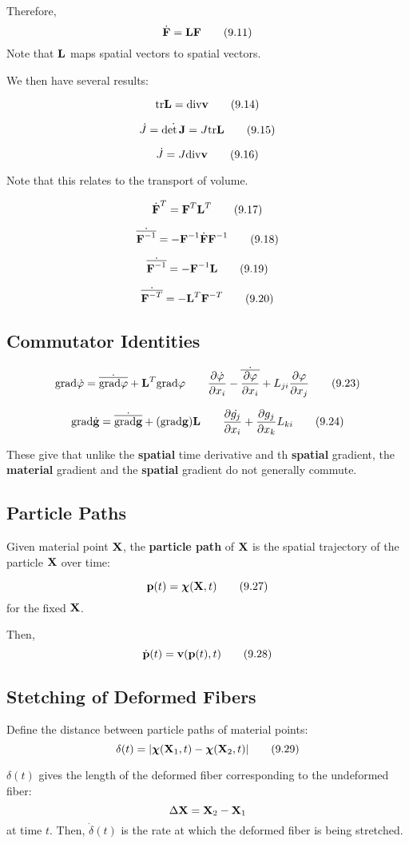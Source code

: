\documentclass{article}
\newcommand{\Chi}{\boldsymbol{\chi}}
\begin{document}
Therefore,
\[
	\dot{\textbf{F}} = \textbf{L}\textbf{F}\tag{9.11}
\]
Note that $\textbf{L}$ maps spatial vectors to spatial vectors.

We then have several results:


\[
	\text{tr}\textbf{L} = \text{div}\textbf{v}\tag{9.14}
\]

\[
	\dot{J} = \dot{\det\textbf{J}} = J\text{tr}\textbf{L}\tag{9.15}
\]

\[
	\dot{J} = J\text{div}\textbf{v}\tag{9.16}
\]

Note that this relates to the transport of volume.

\[
	\dot{\textbf{F}}^T = \textbf{F}^T\textbf{L}^T\tag{9.17}
\]

\[
	\dot{\overline{\textbf{F}^{-1}}} = -\textbf{F}^{-1}\dot{\textbf{F}}\textbf{F}^{-1}\tag{9.18}
\]

\[
	\dot{\overline{\textbf{F}^{-1}}} = -\textbf{F}^{-1}\textbf{L}\tag{9.19}
\]

\[
	\dot{\overline{\textbf{F}^{-T}}} = -\textbf{L}^T\textbf{F}^{-T}\tag{9.20}
\]


\subsection{Commutator Identities}
\[
	\text{grad}\dot{\varphi} = \dot{\overline{\text{grad}\varphi}} + \textbf{L}^T\text{grad}\varphi \qquad \frac{\partial {\dot{\varphi}}}{\partial {x_i}} - \dot{\overline{\frac{\partial {\varphi}}{\partial {x_i}}}} + L_{ji}\frac{\partial {\varphi}}{\partial {x_j}}\tag{9.23}
\]

\[
	\text{grad}\dot{\textbf{g}} = \dot{\overline{\text{grad}\textbf{g}}} + (\text{grad}\textbf{g})\textbf{L} \qquad \frac{\partial {\dot{g_j}}}{\partial {x_i}} + \frac{\partial {g_j}}{\partial {x_k}}L_{ki}\tag{9.24}
\]

These give that unlike the \textbf{spatial} time derivative and th \textbf{spatial} gradient, the \textbf{material} gradient and the \textbf{spatial} gradient do not generally commute.

\subsection{Particle Paths}
Given material point $\textbf{X}$, the \textbf{particle path} of $\textbf{X}$ is the spatial trajectory of the particle $\textbf{X}$ over time:

\[
	\p(t) = \Chi(\X, t)\tag{9.27}
\]
for the fixed $\textbf{X}$.


Then,
\[
	\dot{\textbf{p}}(t) = \textbf{v}(\textbf{p}(t),t)\tag{9.28}
\]
\subsection{Stetching of Deformed Fibers}
Define the distance between particle paths of material points:
\[
	\delta(t) = |\Chi(\X_1,t) - \Chi(\X_2,t)|\tag{9.29}
\]

\begin{remark}
	$\delta(t)$ gives the length of the deformed fiber corresponding to the undeformed fiber:
	$$\Delta\textbf{X} = \textbf{X}_2 - \textbf{X}_1$$
	at time $t$. Then, $\dot{\delta}(t)$ is the rate at which the deformed fiber is being stretched.
\end{remark}
\end{document}

